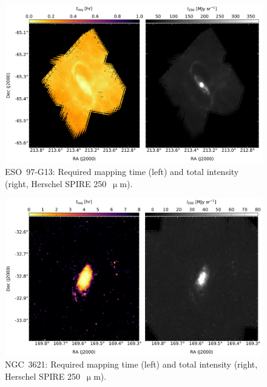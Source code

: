 \begin{figure}[!htbp]
\centering
\includegraphics[width=\textwidth]{figures/galaxies/eso9713}
\caption[~ESO 97-G13 required mapping time.]{ESO~97-G13: Required mapping time (left) and total intensity (right, Herschel SPIRE 250~$\upmu$m).}
\label{fig:eso9713}
\end{figure}

\begin{figure}[!htbp]
\centering
\includegraphics[width=\textwidth]{figures/galaxies/ngc3621}
\caption[~NGC 3621 required mapping time.]{NGC~3621: Required mapping time (left) and total intensity (right, Herschel SPIRE 250~$\upmu$m).}
\label{fig:ngc3621}
\end{figure}

